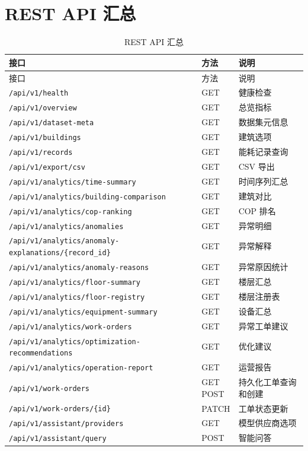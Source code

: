 \documentclass[12pt,a4paper]{ctexart}
\newcommand{\code}[1]{{\footnotesize\nolinkurl{#1}}}
\begin{document}
\section{REST API 汇总}
\begin{longtable}{p{5cm}p{2cm}p{6.8cm}}
\caption{REST API 汇总}\\
\toprule
接口 & 方法 & 说明 \\
\midrule
\endfirsthead
\toprule
接口 & 方法 & 说明 \\
\midrule
\endhead
\code{/api/v1/health} & GET & 健康检查 \\
\code{/api/v1/overview} & GET & 总览指标 \\
\code{/api/v1/dataset-meta} & GET & 数据集元信息 \\
\code{/api/v1/buildings} & GET & 建筑选项 \\
\code{/api/v1/records} & GET & 能耗记录查询 \\
\code{/api/v1/export/csv} & GET & CSV 导出 \\
\code{/api/v1/analytics/time-summary} & GET & 时间序列汇总 \\
\code{/api/v1/analytics/building-comparison} & GET & 建筑对比 \\
\code{/api/v1/analytics/cop-ranking} & GET & COP 排名 \\
\code{/api/v1/analytics/anomalies} & GET & 异常明细 \\
\code{/api/v1/analytics/anomaly-explanations/\{record_id\}} & GET & 异常解释 \\
\code{/api/v1/analytics/anomaly-reasons} & GET & 异常原因统计 \\
\code{/api/v1/analytics/floor-summary} & GET & 楼层汇总 \\
\code{/api/v1/analytics/floor-registry} & GET & 楼层注册表 \\
\code{/api/v1/analytics/equipment-summary} & GET & 设备汇总 \\
\code{/api/v1/analytics/work-orders} & GET & 异常工单建议 \\
\code{/api/v1/analytics/optimization-recommendations} & GET & 优化建议 \\
\code{/api/v1/analytics/operation-report} & GET & 运营报告 \\
\code{/api/v1/work-orders} & \shortstack{GET\\POST} & 持久化工单查询和创建 \\
\code{/api/v1/work-orders/\{id\}} & PATCH & 工单状态更新 \\
\code{/api/v1/assistant/providers} & GET & 模型供应商选项 \\
\code{/api/v1/assistant/query} & POST & 智能问答 \\
\bottomrule
\end{longtable}
\end{document}
